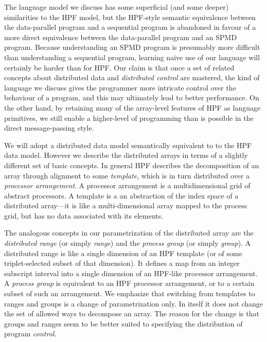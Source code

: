 The language model we discuss has some superficial (and some deeper)
similarities to the HPF model, but the HPF-style semantic equivalence
between the data-parallel program and a sequential program is abandoned
in favour of a more direct equivalence between the data-parallel program
and an SPMD program.  Because understanding an SPMD program is
presumably more difficult than understanding a sequential program,
learning naive use of our language will certainly be harder than for
HPF.  Our claim is that once a set of related concepts about
distributed data and {\em distributed control} are mastered, the kind
of language we discuss gives the programmer more intricate control over
the behaviour of a program, and this may ultimately lead to better
performance.  On the other hand, by retaining many of the array-level
features of HPF as language primitives, we still enable a higher-level
of programming than is possible in the direct message-passing style.

We will adopt a distributed data model semantically equivalent to
to the HPF data model.  However we describe the distributed arrays in
terms of a slightly different set of basic concepts.  In general HPF
describes the decomposition of an array through alignment to some {\em
template}, which is in turn distributed over a {\em processor
arrangement}.  A processor arrangement is a multidimensional grid of
abstract processors.  A template is a an abstraction of the index space
of a distributed array---it is like a multi-dimensional array mapped to
the process grid, but has no data associated with its elements.

The analogous concepts in our parametrization of the distributed array
are the {\em distributed range} (or simply {\em range}) and the {\em
process group} (or simply {\em group}).  A distributed range is like a
single dimension of an HPF template (or of some triplet-selected subset
of that dimension).  It defines a map from an integer subscript
interval into a single dimension of an HPF-like processor arrangement.
A {\em process group} is equivalent to an HPF processor arrangement, or
to a certain subset of such an arrangement.  We emphasize that
switching from templates to ranges and groups is a change of
parametrization only.  In itself it does not change the set of allowed
ways to decompose an array.  The reason for the change is that groups
and ranges seem to be better suited to specifying the distribution of
program {\em control}.

